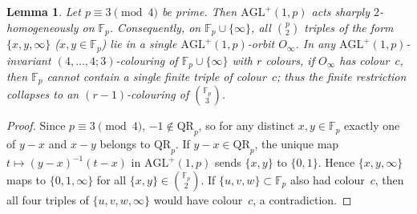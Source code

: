 \documentclass[11pt]{article}
\newtheorem{lemma}[theorem]{Lemma}
\theoremstyle{remark}
\newcommand{\F}{\mathbb{F}}
\begin{document}
\begin{lemma}\label{lem:collapse}
Let $p\equiv 3\pmod 4$ be prime. Then $\mathrm{AGL}^+(1,p)$ acts sharply
$2$-homogeneously on $\F_p$. Consequently, on $\F_p\cup\{\infty\}$, all
$\binom{p}{2}$ triples of the form $\{x,y,\infty\}$ ($x,y\in\F_p$) lie in a
single $\mathrm{AGL}^+(1,p)$-orbit $O_\infty$. In any $\mathrm{AGL}^+(1,p)$-invariant
$(4,\dots,4;3)$-colouring of $\F_p\cup\{\infty\}$ with $r$ colours, if $O_\infty$
has colour~$c$, then $\F_p$ cannot contain a single finite triple of colour~$c$;
thus the finite restriction collapses to an $(r-1)$-colouring of $\binom{\F_p}{3}$.
\end{lemma}

\begin{proof}
Since $p\equiv 3\pmod 4$, $-1\notin\mathrm{QR}_p$, so for any distinct
$x,y\in\F_p$ exactly one of $y-x$ and $x-y$ belongs to $\mathrm{QR}_p$. If
$y-x\in\mathrm{QR}_p$, the unique map $t\mapsto(y-x)^{-1}(t-x)$ in
$\mathrm{AGL}^+(1,p)$ sends $\{x,y\}$ to $\{0,1\}$. Hence $\{x,y,\infty\}$ maps
to $\{0,1,\infty\}$ for all $\{x,y\}\in\binom{\F_p}{2}$. If $\{u,v,w\}\subset\F_p$
also had colour~$c$, then all four triples of $\{u,v,w,\infty\}$ would have
colour~$c$, a contradiction.
\end{proof}
\end{document}
